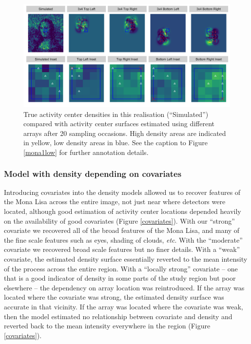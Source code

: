 \documentclass[a4paper,12pt]{article}
\begin{document}
\begin{figure}[htbp]
\centering
\includegraphics[width=1\textwidth]{many_faces_mona_higheffort}
\caption{True activity center densities in this realisation (``Simulated'') compared with activity center surfaces estimated using different arrays after 20 sampling occasions. High density areas are indicated in yellow, low density areas in blue. See the caption to Figure \ref{mona1low} for further annotation details.}
\label{mona1hi}
\end{figure}

\subsubsection{Model with density depending on covariates}
Introducing covariates into the density models allowed us to recover features of the Mona Lisa across the entire image, not just near where detectors were located, although good estimation of activity center locations depended heavily on the availability of good covariates (Figure \ref{covariates}). With our ``strong'' covariate we recovered all of the broad features of the Mona Lisa, and many of the fine scale features such as eyes, shading of clouds, {\it etc}. With the ``moderate'' covariate we recovered broad scale features but no finer details. With a ``weak'' covariate, the estimated density surface essentially reverted to the mean intensity of the process across the entire region. With a ``locally strong'' covariate -- one that is a good indicator of density in some parts of the study region but poor elsewhere -- the dependency on array location was reintroduced. If the array was located where the covariate was strong, the estimated density surface was accurate in that vicinity. If the array was located where the covariate was weak, then the model estimated no relationship between covariate and density and reverted back to the mean intensity everywhere in the region (Figure \ref{covariates}). 
\end{document}
